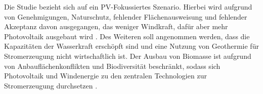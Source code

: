 %		
		
		Die Studie bezieht sich auf ein PV-Fokussiertes Szenario. 
		Hierbei wird aufgrund von Genehmigungen, Naturschutz, fehlender Flächenausweisung und fehlender Akzeptanz davon ausgegangen, das weniger Windkraft, dafür aber mehr Photovoltaik ausgebaut wird \cite[S.4]{ESRa_Fraunhofer}.
		Des Weiteren soll angenommen werden, dass die Kapazitäten der Wasserkraft erschöpft sind und eine Nutzung von Geothermie für Stromerzeugung nicht wirtschaftlich ist. 
		Der Ausbau von Biomasse ist aufgrund von Anbauflächenkonflikten und Biodiversität beschränkt, sodass sich Photovoltaik und Windenergie zu den zentralen Technologien zur Stromerzeugung durchsetzen \cite[S.6]{ESRa_Fraunhofer}. \\
		
